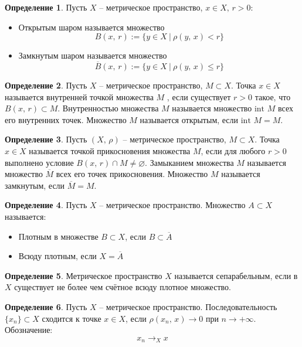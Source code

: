 \documentclass[a4paper,12pt]{article}
\renewcommand{\leq}{\ensuremath{\leqslant}}
\renewcommand{\emptyset}{\ensuremath{\varnothing}}
\theoremstyle{plain}
\theoremstyle{definition}
\newtheorem{definition}{Определение}[section]
\theoremstyle{remark}
\begin{document}
\begin{definition}
  Пусть $X$ -- метрическое пространство, $x \in X,\, r > 0$:
  \begin{itemize}
    \item Открытым шаром называется множество 
    \[
      B(x,\, r) := \{y \in X \:\vert\: \rho(y,\,x) < r\}
    \]
    \item Замкнутым шаром называется множество
    \[
      \overline{B}(x,\,r) := \{y \in X \:\vert\: \rho(y,\,x) \leq r\}
    \]
  \end{itemize}
\end{definition}

\begin{definition}
  Пусть $X$ -- метрическое пространство, $M \subset X$. Точка $x \in X$ называется внутренней точкой множества $M$ , если существует $r > 0$ такое, что $B(x,\, r) \subset M$. Внутренностью множества $M$ называется множество $\text{int }M$ всех его внутренних точек. Множество $M$ называется открытым, если $\text{int }M = M$.
\end{definition}

\begin{definition}
  Пусть $(X,\, \rho)$ -- метрическое пространство, $M \subset X$. Точка $x \in X$ называется точкой прикосновения множества $M$, если для любого $r > 0$ выполнено условие $B(x,\, r) \cap M \neq \emptyset$. Замыканием множества $M$ называется множество $\overline{M}$ всех его точек прикосновения. Множество $M$ называется замкнутым, если $\overline{M} = M$.
\end{definition}

\begin{definition}
  Пусть $X$ -- метрическое пространство. Множество $A \subset X$ называется:
  \begin{itemize}
    \item Плотным в множестве $B \subset X$, если $B \subset \overline{A}$
    \item Всюду плотным, если $X = \overline{A}$
  \end{itemize}
\end{definition}

\begin{definition}
  Метрическое пространство $X$ называется сепарабельным, если в $X$ существует не более чем счётное всюду плотное множество.
\end{definition}

\begin{definition}
  Пусть $X$ -- метрическое пространство. Последовательность $\{x_n\} \subset X$ сходится к точке $x \in X$, если $\rho(x_n,\, x) \to 0$ при $n \to +\infty$. Обозначение: 
  \[
    x_n \to_X x
  \]
\end{definition}
\end{document}

